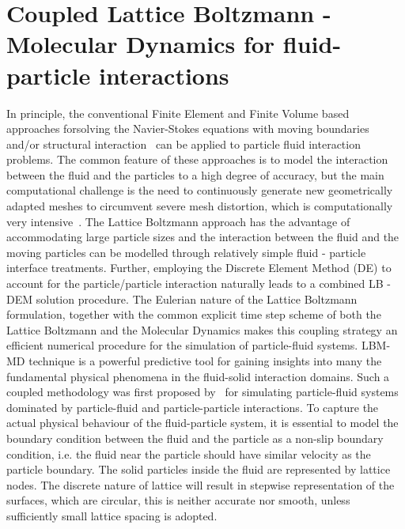 \section{Coupled Lattice Boltzmann - Molecular Dynamics for fluid-particle interactions}
In principle, the conventional Finite Element and Finite Volume based approaches forsolving the Navier-Stokes equations with moving boundaries and/or structural interaction~\citep{Bathe2004} can be applied to particle fluid interaction problems. The common feature of these approaches is to model the interaction between the fluid and the particles to a high degree of accuracy, but the main computational challenge is the need to continuously generate new geometrically adapted meshes to circumvent severe mesh distortion, which is computationally very intensive~\citep{Han2007}. The Lattice Boltzmann approach has the advantage of accommodating large particle sizes and the interaction between the fluid and the moving particles can be modelled through relatively simple fluid - particle interface treatments. Further, employing the Discrete Element Method (DE) to account for the particle/particle interaction naturally leads to a combined LB - DEM solution procedure. The Eulerian nature of the Lattice Boltzmann formulation, together with the common explicit time step scheme of both the Lattice Boltzmann and the Molecular Dynamics makes this coupling strategy an efficient numerical procedure for the simulation of particle-fluid systems. LBM-MD technique is a powerful predictive tool for gaining insights into many the fundamental physical phenomena in the fluid-solid interaction domains. Such a coupled methodology was first proposed by~\citep{Cook2004} for simulating particle-fluid systems dominated by particle-fluid and particle-particle interactions. To capture the actual physical behaviour of the fluid-particle system, it is essential to model the boundary condition between the fluid and the particle as a non-slip boundary condition, i.e. the fluid near the particle should have similar velocity as the particle boundary. The solid particles inside the fluid are represented by lattice nodes. The discrete nature of lattice will result in stepwise representation of the surfaces, which are circular, this is neither accurate nor smooth, unless sufficiently small lattice spacing is adopted. 


